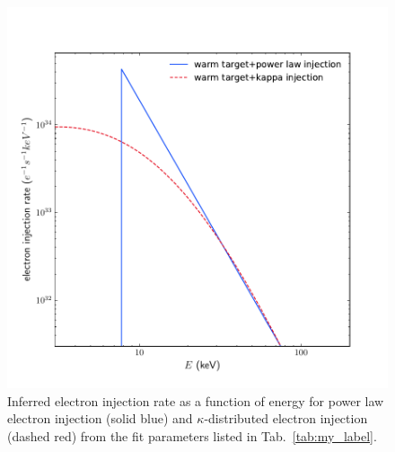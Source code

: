 \begin{table}[ht!]
    \centering
    \caption{Comparison of various model parameters between "{\it vth+thick2}", "{\it vth+thick\_warm}" and "{\it vth+thick\_warm\_kappa}" model for the same time window of STIX spectra as shown in Fig.~\ref{fig:stix_an}.}
    \label{tab:my_label}
\end{table}

\begin{figure}
    \centering
    \includegraphics[width=0.8\linewidth, trim={0cm 0cm 1cm 1cm}, clip]{Figures/e_ij.pdf}
    \caption{Inferred electron injection rate as a function of energy for power law electron injection (solid blue) and $\kappa$-distributed electron injection (dashed red) from the fit parameters listed in Tab.~\ref{tab:my_label}.}
    \label{fig:e-injection}
\end{figure}
